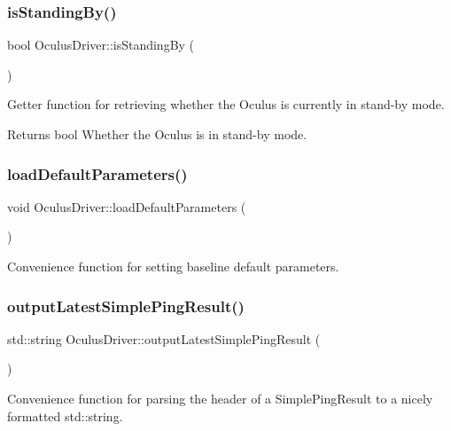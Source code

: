 \subsubsection{\texorpdfstring{is\+Standing\+By()}{isStandingBy()}}
{\footnotesize\ttfamily bool Oculus\+Driver\+::is\+Standing\+By (\begin{DoxyParamCaption}{ }\end{DoxyParamCaption})}

Getter function for retrieving whether the Oculus is currently in stand-\/by mode.

\begin{DoxyReturn}{Returns}
bool Whether the Oculus is in stand-\/by mode. 
\end{DoxyReturn}
\mbox{\label{classOculusDriver_a062f28cdd182b2e9837a8ab47fbf9d92}} 
\subsubsection{\texorpdfstring{load\+Default\+Parameters()}{loadDefaultParameters()}}
{\footnotesize\ttfamily void Oculus\+Driver\+::load\+Default\+Parameters (\begin{DoxyParamCaption}{ }\end{DoxyParamCaption})}

Convenience function for setting baseline \textquotesingle{}default\textquotesingle{} parameters. \mbox{\label{classOculusDriver_a0d5e4a70a4961e98a99691ab4ea2f206}} 
\subsubsection{\texorpdfstring{output\+Latest\+Simple\+Ping\+Result()}{outputLatestSimplePingResult()}}
{\footnotesize\ttfamily std\+::string Oculus\+Driver\+::output\+Latest\+Simple\+Ping\+Result (\begin{DoxyParamCaption}{ }\end{DoxyParamCaption})}

Convenience function for parsing the header of a Simple\+Ping\+Result to a nicely formatted std\+::string.

